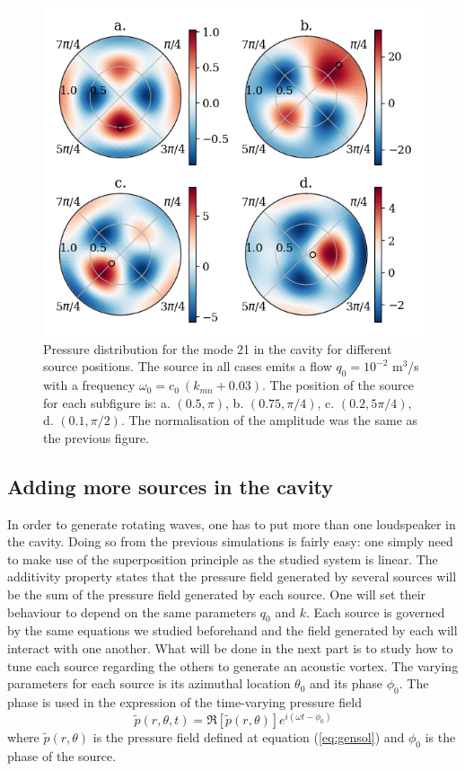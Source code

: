 \documentclass[%
 reprint,
 amsmath,amssymb,
 aps,
]{revtex4-2}
\begin{document}
\begin{figure}[h]
    \centering
    \includegraphics[width=.5\textwidth]{figures/source_pos.png}
    \caption{Pressure distribution for the mode 21 in the cavity for different source positions. The source in all cases emits a flow $q_0 = 10^{-2}$ m$^3$/s with a frequency $\omega_0 = c_0 \: (k_{mn} + 0.03)$. The position of the source for each subfigure is: a. $(0.5, \pi)$, b. $(0.75, \pi/4)$, c. $(0.2, 5 \pi/4)$, d. $(0.1, \pi/2)$. The normalisation of the amplitude was the same as the previous figure.}
    \label{fig:source_pos}
\end{figure}

\subsection{Adding more sources in the cavity}
In order to generate rotating waves, one has to put more than one loudspeaker in the cavity. Doing so from the previous simulations is fairly easy: one simply need to make use of the superposition principle as the studied system is linear. The additivity property states that the pressure field generated by several sources will be the sum of the pressure field generated by each source. One will set their behaviour to depend on the same parameters $q_0$ and $k$. Each source is governed by the same equations we studied beforehand and the field generated by each will interact with one another. What will be done in the next part is to study how to tune each source regarding the others to generate an acoustic vortex. The varying parameters for each source is its azimuthal location $\theta_0$ and its phase $\phi_0$. The phase is used in the expression of the time-varying pressure field
\begin{equation}
    \tilde{p}(r, \theta, t) = \Re\left[\tilde{p}(r, \theta)\right] e^{i (\omega t - \phi_0)}
\end{equation}
where $\tilde{p}(r, \theta)$ is the pressure field defined at equation (\ref{eq:gensol}) and $\phi_0$ is the phase of the source.
\end{document}
